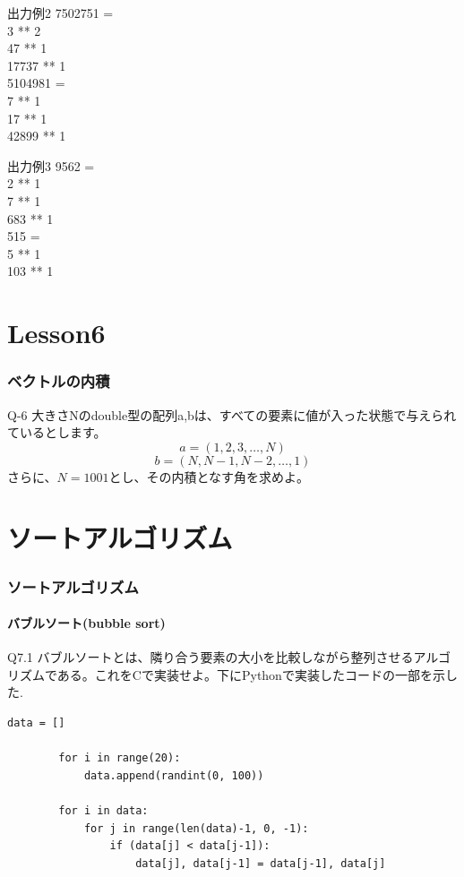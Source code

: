 \documentclass[dvipdfmx]{beamer}
\begin{document}
\begin{frame}
	\begin{block}{出力例2}
		7502751 =\\
		3 ** 2\\
		47 ** 1\\
		17737 ** 1\\
		5104981 =\\
		7 ** 1\\
		17 ** 1\\
		42899 ** 1\\
	\end{block}
	\begin{block}{出力例3}
		9562 =\\
		2 ** 1\\
		7 ** 1\\
		683 ** 1\\
		515 =\\
		5 ** 1\\
		103 ** 1
	\end{block}
\end{frame}

\section{Lesson6}
\begin{frame}
	\frametitle{ベクトルの内積}
	\begin{itembox}[l]{Q-6}
		大きさNのdouble型の配列a,bは、すべての要素に値が入った状態で与えられているとします。\\
		$$a = (1,2,3,\dots,N)$$
		$$b = (N, N-1, N-2,\dots,1)$$
		さらに、$N=1001$とし、その内積となす角を求めよ。
	\end{itembox}
\end{frame}

\section{ソートアルゴリズム}
\begin{frame}[t, fragile]
    \frametitle{ソートアルゴリズム}
    \framesubtitle{バブルソート(bubble sort)}
    \begin{itembox}[l]{Q7.1}
        バブルソートとは、隣り合う要素の大小を比較しながら整列させるアルゴリズムである。これをCで実装せよ。下にPythonで実装したコードの一部を示した.
    \end{itembox}
    \begin{lstlisting}[gobble=8, caption=bubbleSort.py, label=bubbleSort]
        data = []

        for i in range(20):
            data.append(randint(0, 100))

        for i in data:
            for j in range(len(data)-1, 0, -1):
                if (data[j] < data[j-1]):
                    data[j], data[j-1] = data[j-1], data[j]
    \end{lstlisting}
\end{frame}
\end{document}
